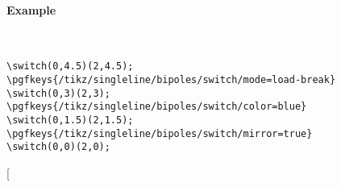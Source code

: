\documentclass[a4]{article}
\begin{document}
\paragraph{Example} \ \\
\begin{examplebox}
\begin{minipage}{0.25\textwidth}
\end{minipage}
\begin{minipage}{0.55\textwidth}
\begin{verbatim}
\switch(0,4.5)(2,4.5);
\pgfkeys{/tikz/singleline/bipoles/switch/mode=load-break}
\switch(0,3)(2,3);
\pgfkeys{/tikz/singleline/bipoles/switch/color=blue}
\switch(0,1.5)(2,1.5);
\pgfkeys{/tikz/singleline/bipoles/switch/mirror=true}
\switch(0,0)(2,0);
\end{verbatim}
\end{minipage}
\end{examplebox}
\twocolumn[
\end{document}

